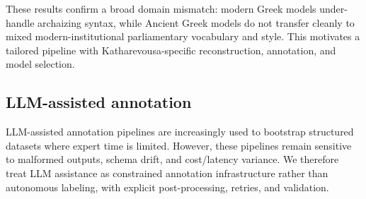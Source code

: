 These results confirm a broad domain mismatch: modern Greek models under-handle archaizing syntax, while Ancient Greek models do not transfer cleanly to mixed modern-institutional parliamentary vocabulary and style. This motivates a tailored pipeline with Katharevousa-specific reconstruction, annotation, and model selection.



\subsection{LLM-assisted annotation}



LLM-assisted annotation pipelines are increasingly used to bootstrap structured datasets where expert time is limited. However, these pipelines remain sensitive to malformed outputs, schema drift, and cost/latency variance. We therefore treat LLM assistance as constrained annotation infrastructure rather than autonomous labeling, with explicit post-processing, retries, and validation.

